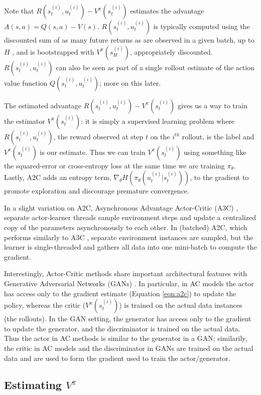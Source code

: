 \documentclass[11pt, oneside]{article}   	%
\begin{document}
\bigskip
\noindent
Note that $R(s^{(i)}_t, u^{(i)}_t)  - V^{\pi}(s^{(i)}_t)$ estimates the advantage $A(s, a) = Q(s, a) - V (s)$.  $R(s^{(i)}_t, u^{(i)}_t)$ 
is typically computed using the discounted sum of as many future returns as are observed in a given batch, up to $H$ , and is bootstrapped with $V^{\pi}(s^{(i)}_H)$, 
appropriately discounted. $R(s^{(i)}_t, u^{(i)}_t)$ can also be seen as part of a single rollout estimate of the action value function  $Q(s^{(i)}_t, u^{(i)}_t)$; more on this later.

\bigskip
\noindent
The estimated advantage $R(s^{(i)}_t, u^{(i)}_t) - V^{\pi}(s^{(i)}_t)$ gives us a way to train the estimator $V^{\pi}(s^{(i)}_t)$: it is simply a supervised learning problem
where $R(s^{(i)}_t, u^{(i)}_t)$, the reward observed at step $t$ on the $i^{th}$ rollout, is the label and $V^{\pi}(s^{(i)}_t)$ is our estimate. Thus we can train $V^{\pi}(s^{(i)}_t)$
using something like the squared-error or cross-entropy loss at the same time we are training $\pi_{\theta}$. Lastly, A2C adds an entropy term,
$\nabla_{\theta} H(\pi_{\theta} (u^{(i)}_t | s^{(i)}_t))$, to the gradient to promote exploration and discourage premature convergence.

\bigskip
\noindent
In a slight variation on A2C, Asynchronous Advantage Actor-Critic (A3C) \cite{2016arXiv160201783M}, separate actor-learner threads sample environment steps and update a 
centralized copy of the parameters asynchronously to each other. In (batched) A2C, which performs similarly to A3C \cite{2017arXiv170706347S}, separate environment instances 
are sampled, but the learner is single-threaded and gathers all data into one mini-batch to compute the gradient.

\bigskip
\noindent
Interestingly, Actor-Critic methods share important architectural features with Generative Adversarial Networks (GANs) \cite{2016arXiv160201783M}. In particular, in AC models the actor 
has access only to the gradient estimate (Equation \ref{eqn:a2c}) to update the policy, whereas the critic ($ V^{\pi}(s^{(i)}_t)$) is trained on the actual data instances (the rollouts).  In the GAN setting, 
the generator has access only to the gradient to update the generator, and the discriminator is trained on the actual data. Thus the actor in AC methods is similar to the generator in a GAN; similarily,
the critic in AC models and the discriminator in GANs are trained on the actual data and are used to form the gradient used to train the actor/generator. 

\subsection{Estimating $V^{\pi}$}
\label{seq:estimating_v}
\end{document}

